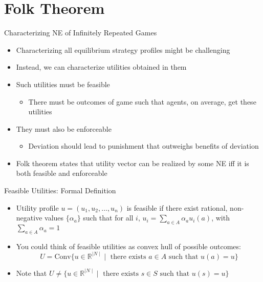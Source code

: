 \documentclass[11pt,aspectratio=169]{beamer}
\begin{document}
  
 \section{Folk Theorem}  
  
  \begin{frame}{Characterizing NE of Infinitely Repeated Games}
   \begin{itemize}[<+->]
   \setlength{\itemsep}{0.7em}
    \item Characterizing all equilibrium strategy profiles might be challenging
    \item Instead, we can characterize utilities obtained in them
    \item Such utilities must be \alert{feasible}
    \begin{itemize}[<.->]
     \item There must be outcomes of game such that agents, on average, get these utilities
    \end{itemize}
    \item They must also be \alert{enforceable}
    \begin{itemize}[<.->]
     \item Deviation should lead to punishment that outweighs benefits of deviation
    \end{itemize}
    \item \alert{Folk theorem} states that utility vector can be realized by some NE iff it is both feasible and enforceable
   \end{itemize}
  \end{frame}
  
  \begin{frame}{Feasible Utilities: Formal Definition}
   \begin{itemize}[<+->]
   \setlength{\itemsep}{1.2em}
    \item \alert{Utility profile} $u = (u_1,u_2,\dots,u_n)$ is \alert{feasible} if there exist \alert{rational}, \alert{non-negative} values $\{\alpha_a\}$ such that for all $i$, $u_i = \sum_{a\in A} \alpha_a u_i(a)$, with $\sum_{a\in A} \alpha_a = 1$
    \item You could think of feasible utilities as \alert{convex hull} of possible outcomes:
    $$U = \text{Conv}\{ u \in  \mathbb{R}^{\mid N \mid} \mid \text{ there exists } a \in A \text{ such that } u(a) = u \}$$
    \item Note that $U \neq  \{ u \in  \mathbb{R} ^{\mid N \mid}  \mid \text{ there exists } s \in S \text{ such that } u(s) = u \}$
   \end{itemize}
  \end{frame}
  
\end{document}
